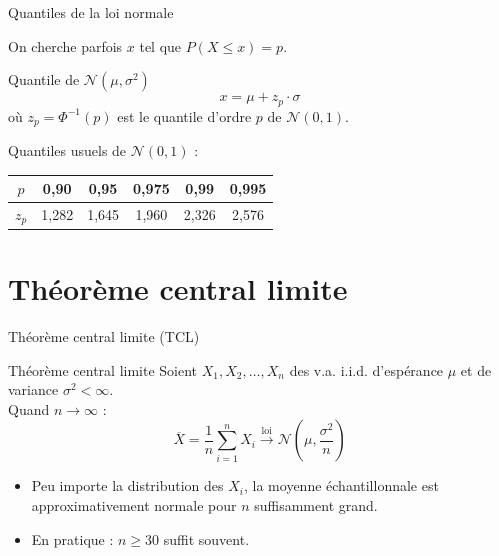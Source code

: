 \documentclass{BeamerTemplate}
\begin{document}
\begin{frame}[t]{Quantiles de la loi normale}

On cherche parfois $x$ tel que $P(X \le x) = p$.

\bigskip
\begin{Boite}{Quantile de $\mathcal{N}(\mu, \sigma^2)$}
$$x = \mu + z_p \cdot \sigma$$
où $z_p = \Phi^{-1}(p)$ est le quantile d'ordre $p$ de $\mathcal{N}(0,1)$.
\end{Boite}

\medskip
Quantiles usuels de $\mathcal{N}(0,1)$ :
\begin{center}
\begin{tabular}{|c|c|c|c|c|c|}
\hline
$p$ & 0{,}90 & 0{,}95 & 0{,}975 & 0{,}99 & 0{,}995 \\ \hline
$z_p$ & 1{,}282 & 1{,}645 & 1{,}960 & 2{,}326 & 2{,}576 \\ \hline
\end{tabular}
\end{center}

\end{frame}

\section{Théorème central limite}

\begin{frame}[t]{Théorème central limite (TCL)}

\begin{Boite}{Théorème central limite}
Soient $X_1, X_2, \ldots, X_n$ des v.a. i.i.d. d'espérance $\mu$ et de variance $\sigma^2 < \infty$.\\
Quand $n \to \infty$ :
$$\overline{X} = \frac{1}{n}\sum_{i=1}^{n} X_i \xrightarrow{\text{loi}} \mathcal{N}\!\left(\mu, \frac{\sigma^2}{n}\right)$$
\end{Boite}

\medskip
\begin{itemize}\itemsep4mm
  \item \alert{Peu importe} la distribution des $X_i$, la moyenne échantillonnale est approximativement normale pour $n$ suffisamment grand.
  \item En pratique : $n \ge 30$ suffit souvent.
\end{itemize}

\end{frame}
\end{document}

